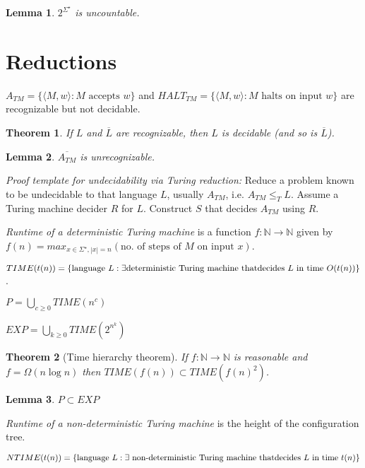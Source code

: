 \documentclass[letterpaper,landscape,11pt]{article}
\newtheorem{theorem}{Theorem}
\newtheorem{lemma}{Lemma}
\begin{document}
\begin{lemma}
	$2^{\Sigma^\star}$ is uncountable.
\end{lemma}

\section{Reductions}

$A_{TM} = \{\langle M, w \rangle : M \text{ accepts } w\}$ and $HALT_{TM} = \{\langle M, w \rangle : M \text{ halts on input } w\}$ are recognizable but not decidable.

\begin{theorem}
	If $L$ and $\overline{L}$ are recognizable, then $L$ is decidable (and so is $\overline{L}$).
\end{theorem}

\begin{lemma}
	$\overline{A_{TM}}$ is unrecognizable.
\end{lemma}

\emph{Proof template for undecidability via Turing reduction:} Reduce a problem known to be undecidable to that language $L$, usually $A_{TM}$, i.e. $A_{TM} \leq_T L$. Assume a Turing machine decider $R$ for $L$. Construct $S$ that decides $A_{TM}$ using $R$.

\emph{Runtime of a deterministic Turing machine} is a function $f : \mathbb{N} \rightarrow \mathbb{N}$ given by $f(n) = max_{x \in \Sigma^\star, |x| = n} (\text{no. of steps of } M \text{ on input } x)$.

$TIME(t(n)) = \{\text{language } L : \exists \text{deterministic Turing machine that} \\ \text{decides } L \text{ in time } O(t(n))\}$.

$P = \bigcup_{c \geq 0} TIME(n^c)$

$EXP = \bigcup_{k \geq 0} TIME(2^{n^k})$

\begin{theorem}[Time hierarchy theorem]
	If $f : \mathbb{N} \rightarrow \mathbb{N}$ is reasonable and $f = \Omega(n\log n)$ then $TIME(f(n)) \subset TIME(f(n)^2)$.
\end{theorem}

\begin{lemma}
	$P \subset EXP$
\end{lemma}

\emph{Runtime of a non-deterministic Turing machine} is the height of the configuration tree.

$NTIME(t(n)) = \{\text{language } L : \exists \text{ non-deterministic Turing machine that} \\ \text{decides } L \text{ in time } t(n)\}$
\end{document}
